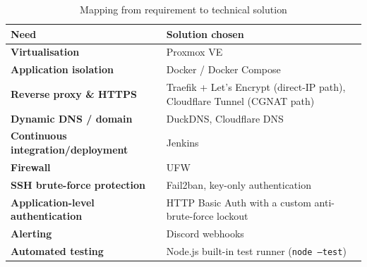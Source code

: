 \begin{table}[h]
  \centering
  \renewcommand{\arraystretch}{1.25}
  \begin{tabularx}{\textwidth}{|>{\bfseries}l|X|}
    \hline
    \rowcolor{ucacred!15} \textbf{Need} & \textbf{Solution chosen} \\
    \hline
    Virtualisation & Proxmox VE \\
    \hline
    Application isolation & Docker / Docker Compose \\
    \hline
    Reverse proxy \& HTTPS & Traefik + Let's Encrypt (direct-IP path), Cloudflare Tunnel (CGNAT path) \\
    \hline
    Dynamic DNS / domain & DuckDNS, Cloudflare DNS \\
    \hline
    Continuous integration/deployment & Jenkins \\
    \hline
    Firewall & UFW \\
    \hline
    SSH brute-force protection & Fail2ban, key-only authentication \\
    \hline
    Application-level authentication & HTTP Basic Auth with a custom anti-brute-force lockout \\
    \hline
    Alerting & Discord webhooks \\
    \hline
    Automated testing & Node.js built-in test runner (\texttt{node --test}) \\
    \hline
  \end{tabularx}
  \caption{Mapping from requirement to technical solution}
\end{table}

\clearpage
